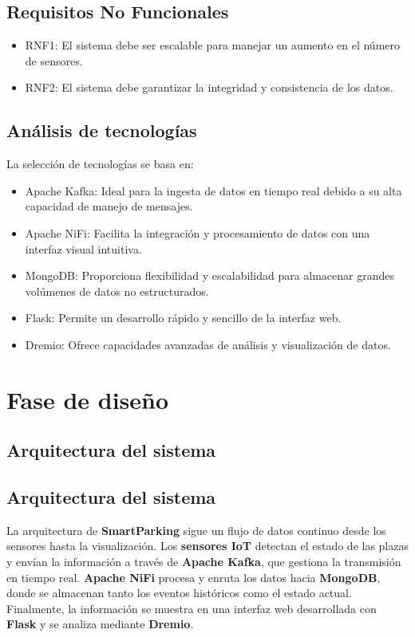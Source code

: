 \documentclass{../../../miPlantilla}
\begin{document}
\subsection{Requisitos No Funcionales}
\begin{itemize}
  \item RNF1: El sistema debe ser escalable para manejar un aumento en el número de sensores.
  \item RNF2: El sistema debe garantizar la integridad y consistencia de los datos.
\end{itemize}

\subsection{Análisis de tecnologías}
La selección de tecnologías se basa en:

\begin{itemize}
  \item Apache Kafka: Ideal para la ingesta de datos en tiempo real debido a su alta capacidad de manejo de mensajes.
  \item Apache NiFi: Facilita la integración y procesamiento de datos con una interfaz visual intuitiva.
  \item MongoDB: Proporciona flexibilidad y escalabilidad para almacenar grandes volúmenes de datos no estructurados.
  \item Flask: Permite un desarrollo rápido y sencillo de la interfaz web.
  \item Dremio: Ofrece capacidades avanzadas de análisis y visualización de datos.
\end{itemize}

\newpage

\section{Fase de diseño}
\subsection{Arquitectura del sistema}
\subsection{Arquitectura del sistema}
La arquitectura de \textbf{SmartParking} sigue un flujo de datos continuo desde los sensores hasta la visualización. Los \textbf{sensores IoT}
detectan el estado de las plazas y envían la información a través de \textbf{Apache Kafka}, que gestiona la transmisión en tiempo real.
\textbf{Apache NiFi} procesa y enruta los datos hacia \textbf{MongoDB}, donde se almacenan tanto los eventos históricos como el estado actual.
Finalmente, la información se muestra en una interfaz web desarrollada con \textbf{Flask} y se analiza mediante \textbf{Dremio}.
\end{document}
